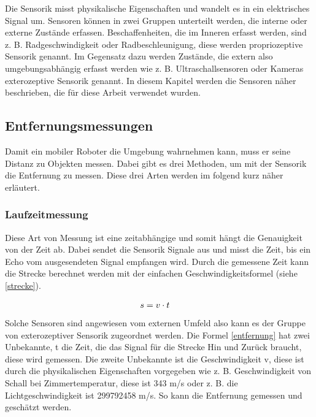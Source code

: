 Die Sensorik misst physikalische Eigenschaften und wandelt es in ein elektrisches Signal um. Sensoren können in zwei Gruppen unterteilt werden, die interne oder externe Zustände erfassen. Beschaffenheiten, die im Inneren erfasst werden, sind z. B. Radgeschwindigkeit oder Radbeschleunigung, diese werden propriozeptive Sensorik genannt. Im Gegensatz dazu werden Zustände, die extern also umgebungsabhängig erfasst werden wie z. B. Ultraschallsensoren oder Kameras exterozeptive Sensorik genannt. In diesem Kapitel werden die Sensoren näher beschrieben, die für diese Arbeit verwendet wurden. 

\subsection{Entfernungsmessungen}

Damit ein mobiler Roboter die Umgebung wahrnehmen kann, muss er seine Distanz zu Objekten messen. Dabei gibt es drei Methoden, um mit der Sensorik die Entfernung zu messen. Diese drei Arten werden im folgend kurz näher erläutert. 
\subsubsection{Laufzeitmessung}\label{subsubsec:Laufzeitmessung}
Diese Art von Messung ist eine zeitabhängige und somit hängt die Genauigkeit von der Zeit ab. Dabei sendet die Sensorik Signale aus und misst die Zeit, bis ein Echo vom ausgesendeten Signal empfangen wird. Durch die gemessene Zeit kann die Strecke berechnet werden mit der einfachen Geschwindigkeitsformel (siehe \autoref{strecke}). 

\begin{align}
\centering
s &= v \cdot t \label{strecke}
\end{align}
Solche Sensoren sind angewiesen vom externen Umfeld also kann es der Gruppe von exterozeptiver Sensorik zugeordnet werden. Die Formel \autoref{entfernung} hat zwei Unbekannte, t die Zeit, die das Signal für die Strecke Hin und Zurück braucht, diese wird gemessen. Die zweite Unbekannte ist die Geschwindigkeit v, diese ist durch die physikalischen Eigenschaften vorgegeben wie z. B. Geschwindigkeit von Schall bei Zimmertemperatur, diese ist 343 m/s oder z. B. die Lichtgeschwindigkeit ist 299792458 m/s. So kann die Entfernung gemessen und geschätzt werden. 

